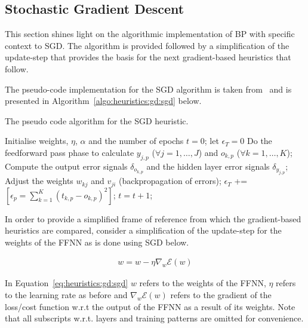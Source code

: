 \subsection{Stochastic Gradient Descent}\label{sec:heuristics:gd:sgd}

This section shines light on the algorithmic implementation of \ac{BP} with specific context to \ac{SGD}. The algorithm is provided followed by a simplification of the update-step that provides the basis for the next gradient-based heuristics that follow.

The pseudo-code implementation for the \acs{SGD} algorithm is taken from~\cite{ref:engelbrecht:2007} and is presented in Algorithm~\ref{algo:heuristics:gd:sgd} below.

\begin{algorithm}[H]
      \caption{The pseudo code algorithm for the \acs{SGD} heuristic.}
      \label{algo:heuristics:gd:sgd}
      \begin{algorithmic}
            \State Initialise weights, $\eta$, $\alpha$ and the number of epochs $t=0$;
            let $\epsilon_{T} = 0$
            \State Do the feedforward pass phase to calculate $y_{j,p}$ ($\forall j = 1, \dots, J$) and $o_{k,p}$ ($\forall k = 1, \dots, K$);
            \State Compute the output error signals $\delta_{o_{k,p}}$ and the hidden layer error signals $\delta_{y_{j,p}}$;
            \State Adjust the weights $w_{kj}$ and $v_{ji}$ (backpropagation of errors);
            \State $\epsilon_{T}$ += $[\epsilon_{p} = \sum^{K}_{k=1}(t_{k,p} - o_{k,p})^{2}]$;
            \EndFor
            \State $t = t + 1$;
            \EndWhile
      \end{algorithmic}
\end{algorithm}

In order to provide a simplified frame of reference from which the gradient-based heuristics are compared, consider a simplification of the update-step for the weights of the \acs{FFNN} as is done using \ac{SGD} below.

\begin{equation}
      \label{eq:heuristics:gd:sgd}
      \begin{split}
            w = w - \eta \nabla_{w}\mathcal{E}(w)
      \end{split}
\end{equation}

In Equation~\ref{eq:heuristics:gd:sgd} $w$ refers to the weights of the \acs{FFNN}, $\eta$ refers to the learning rate as before and $\nabla_{w}\mathcal{E}(w)$ refers to the gradient of the loss/cost function w.r.t the output of the \acs{FFNN} as a result of its weights. Note that all subscripts w.r.t. layers and training patterns are omitted for convenience.

